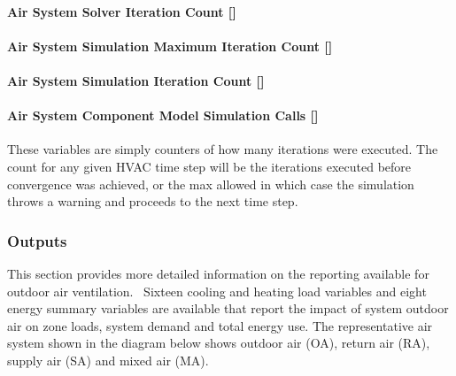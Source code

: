 \paragraph{Air System Solver Iteration Count {[]}}\label{air-system-solver-iteration-count}

\paragraph{Air System Simulation Maximum Iteration Count {[]}}\label{air-system-simulation-maximum-iteration-count}

\paragraph{Air System Simulation Iteration Count {[]}}\label{air-system-simulation-iteration-count}

\paragraph{Air System Component Model Simulation Calls {[]}}\label{air-system-component-model-simulation-calls}

These variables are simply counters of how many iterations were executed. The count for any given HVAC time step will be the iterations executed before convergence was achieved, or the max allowed in which case the simulation throws a warning and proceeds to the next time step.

\subsubsection{Outputs}\label{outputs-1-001}

This section provides more detailed information on the reporting available for outdoor air ventilation.~ Sixteen cooling and heating load variables and eight energy summary variables are available that report the impact of system outdoor air on zone loads, system demand and total energy use. The representative air system shown in the diagram below shows outdoor air (OA), return air (RA), supply air (SA) and mixed air (MA).

